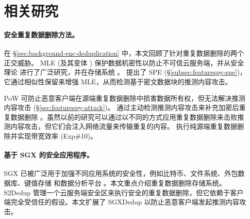 \section{相关研究}
\label{sec:featurespy-related-work}

\paragraph*{安全重复数据删除方法。}
在 \S\ref{sec:background-enc-deduplication} 中，本文回顾了针对重复数据删除的两个正交威胁。 MLE (及其变体 \cite{bellare2013MLE, bellare2013DupLESS, douceur2002reclaiming, li15}) 保护数据机密性以防止不可信云服务端，并从安全理论 \cite{bellare2015interactive, abadi2013message} 进行了广泛研究，并在存储系统 \cite{cox2002pastiche, adya2002farsite, bellare2013DupLESS, armknecht2015transparent, shah15, li15, li19, qin17, li2020Info, ren21}。 \sysnameF 提出了 SPE (\S\ref{subsec:featurespy-spe})，它通过相似性保留来增强 MLE，从而检测基于密文数据块的推测内容攻击。


PoW 可防止恶意客户端在源端重复数据删除中损害数据所有权，但无法解决推测内容攻击 (\S\ref{sec:featurespy-attack})。 \sysnameF 通过主动检测推测内容攻击来补充加密后重复数据删除 \cite{ren21}。虽然以前的研究可以通过以不同的方式应用重复数据删除来击败推测内容攻击，但它们会注入网络流量来传输重复的内容。 \sysnameF 执行纯源端重复数据删除并实现带宽效率 (Exp\#10)。


\paragraph*{基于 SGX 的安全应用程序。}
SGX 已被广泛用于加强不同应用系统的安全性，例如比特币\cite{matetic19BITE}、文件系统\cite{ahmad2018OBLIVIATE,shinde20}、外包数据库\cite{eskandarian17,priebe18,sun21}、键值存储\cite{mishra2018Oblix,bailleu2019SPEICHER,kim2019ShieldStore,bailleu2021Avocado} 和数据分析平台 \cite{schuster15, zheng2017Opaque, bowe2020ZEXE}。本文重点介绍重复数据删除存储系统。 S2Dedup \cite{miranda2021S2Dedup} 管理一个云服务端安全区来执行安全的重复数据删除，但它依赖于客户端完全受信任的假设。本文扩展了 SGXDedup \cite{ren21} 以防止恶意客户端发起推测内容攻击。